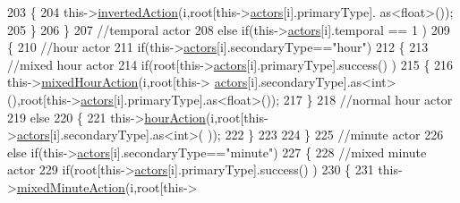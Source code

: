 \begin{DoxyCode}
203                     \{
204                         this->\hyperlink{class_jetpack_adacfc35fab4a621357caf98ce1c9cb54}{invertedAction}(i,root[this->\hyperlink{class_jetpack_a7e16d2f97837f9712a2e6de1c50d99db}{actors}[i].primaryType].
      as<float>());          
205                     \}
206                 \}
207                 \textcolor{comment}{//temporal actor}
208                 \textcolor{keywordflow}{else} \textcolor{keywordflow}{if}(this->\hyperlink{class_jetpack_a7e16d2f97837f9712a2e6de1c50d99db}{actors}[i].temporal == 1 )
209                 \{
210                     \textcolor{comment}{//hour actor}
211                     \textcolor{keywordflow}{if}(this->\hyperlink{class_jetpack_a7e16d2f97837f9712a2e6de1c50d99db}{actors}[i].secondaryType==\textcolor{stringliteral}{"hour"})
212                     \{
213                         \textcolor{comment}{//mixed hour actor}
214                         \textcolor{keywordflow}{if}(root[this->\hyperlink{class_jetpack_a7e16d2f97837f9712a2e6de1c50d99db}{actors}[i].primaryType].success() )
215                         \{
216                             this->\hyperlink{class_jetpack_ac1a49ab4867718cdb415ad74c2066b9d}{mixedHourAction}(i,root[this->
      \hyperlink{class_jetpack_a7e16d2f97837f9712a2e6de1c50d99db}{actors}[i].secondaryType].as<int>(),root[this->\hyperlink{class_jetpack_a7e16d2f97837f9712a2e6de1c50d99db}{actors}[i].primaryType].as<float>());
217                         \}
218                         \textcolor{comment}{//normal hour actor}
219                         \textcolor{keywordflow}{else}
220                         \{
221                             this->\hyperlink{class_jetpack_acd6889af2fe5b057c6bd51b6dac827ef}{hourAction}(i,root[this->\hyperlink{class_jetpack_a7e16d2f97837f9712a2e6de1c50d99db}{actors}[i].secondaryType].as<int>(
      ));
222                         \}
223                     
224                     \}
225                     \textcolor{comment}{//minute actor}
226                     \textcolor{keywordflow}{else} \textcolor{keywordflow}{if}(this->\hyperlink{class_jetpack_a7e16d2f97837f9712a2e6de1c50d99db}{actors}[i].secondaryType==\textcolor{stringliteral}{"minute"})
227                     \{
228                         \textcolor{comment}{//mixed minute actor}
229                         \textcolor{keywordflow}{if}(root[this->\hyperlink{class_jetpack_a7e16d2f97837f9712a2e6de1c50d99db}{actors}[i].primaryType].success() )
230                         \{
231                             this->\hyperlink{class_jetpack_acf8ed1fb594b9e8e224f4ed872a8e093}{mixedMinuteAction}(i,root[this->

\end{DoxyCode}
